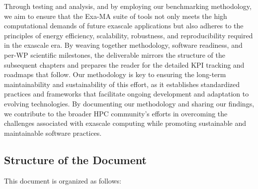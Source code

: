 Through testing and analysis, and by employing our benchmarking methodology, we aim to ensure that the Exa-MA suite of tools not only meets the high computational demands of future exascale applications but also adheres to the principles of energy efficiency, scalability, robustness, and reproducibility required in the exascale era. By weaving together methodology, software readiness, and per-WP scientific milestones, the deliverable mirrors the structure of the subsequent chapters and prepares the reader for the detailed KPI tracking and roadmaps that follow. Our methodology is key to ensuring the long-term maintainability and sustainability of this effort, as it establishes standardized practices and frameworks that facilitate ongoing development and adaptation to evolving technologies. By documenting our methodology and sharing our findings, we contribute to the broader HPC community’s efforts in overcoming the challenges associated with exascale computing while promoting sustainable and maintainable software practices.


\subsection{Structure of the Document}
\label{sec:structure}

This document is organized as follows:

